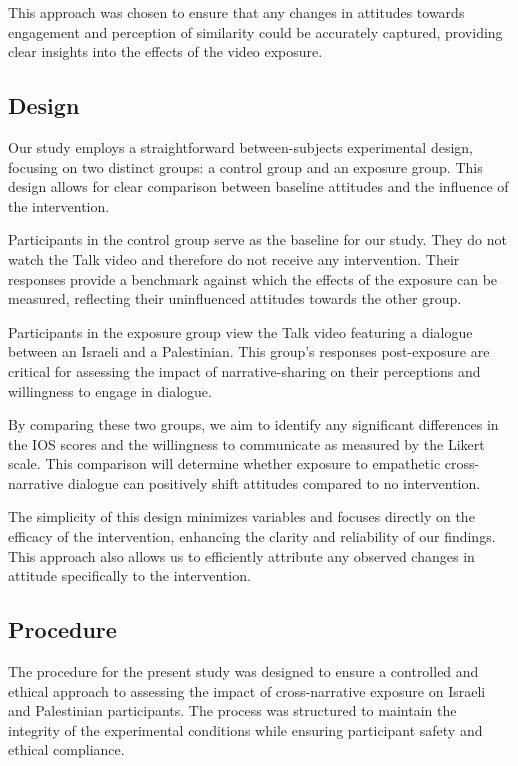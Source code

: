 \documentclass[stu,12pt,floatsintext]{apa7}
\begin{document}
This approach was chosen to ensure that any changes in attitudes towards engagement and perception of similarity could be accurately captured, providing clear insights into the effects of the video exposure.

\subsection{Design}

Our study employs a straightforward between-subjects experimental design, focusing on two distinct groups: a control group and an exposure group. This design allows for clear comparison between baseline attitudes and the influence of the intervention.

Participants in the control group serve as the baseline for our study. They do not watch the \textcite{tedvideo} Talk video and therefore do not receive any intervention. Their responses provide a benchmark against which the effects of the exposure can be measured, reflecting their uninfluenced attitudes towards the other group.

Participants in the exposure group view the \textcite{tedvideo} Talk video featuring a dialogue between an Israeli and a Palestinian. This group's responses post-exposure are critical for assessing the impact of narrative-sharing on their perceptions and willingness to engage in dialogue.

By comparing these two groups, we aim to identify any significant differences in the IOS scores and the willingness to communicate as measured by the Likert scale. This comparison will determine whether exposure to empathetic cross-narrative dialogue can positively shift attitudes compared to no intervention.

The simplicity of this design minimizes variables and focuses directly on the efficacy of the intervention, enhancing the clarity and reliability of our findings. This approach also allows us to efficiently attribute any observed changes in attitude specifically to the intervention.

\subsection{Procedure}

The procedure for the present study was designed to ensure a controlled and ethical approach to assessing the impact of cross-narrative exposure on Israeli and Palestinian participants. The process was structured to maintain the integrity of the experimental conditions while ensuring participant safety and ethical compliance.
\end{document}
